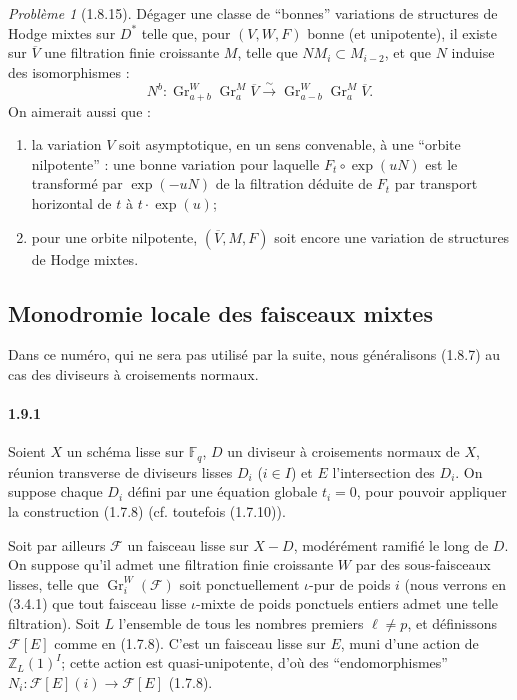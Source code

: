 \documentclass[12pt,a4paper]{article}
\theoremstyle{plain}
\theoremstyle{definition}
\theoremstyle{remark}
\newtheorem{probleme}{Probl\`eme}
\DeclareMathOperator{\Gr}{Gr}
\newcommand{\FF}{{\mathbb{F}}}
\newcommand{\ZZ}{{\mathbb{Z}}}
\begin{document}
\begin{probleme}[1.8.15]
D\'egager une classe de ``bonnes'' variations de structures de Hodge mixtes sur $D^*$ telle que, pour $(V, W, F)$ bonne (et unipotente), il existe sur $\overline{V}$ une filtration finie croissante $M$, telle que $NM_i \subset M_{i-2}$, et que $N$ induise des isomorphismes :
\[ N^b : \Gr_{a+b}^W \Gr_a^M \overline{V} \xrightarrow{\sim} \Gr_{a-b}^W \Gr_a^M \overline{V}. \]
On aimerait aussi que :
\begin{enumerate}[label=\alph*)]
\item la variation $V$ soit asymptotique, en un sens convenable, \`a une ``orbite nilpotente'' : une bonne variation pour laquelle $F_t \circ \exp(uN)$ est le transform\'e par $\exp(-uN)$ de la filtration d\'eduite de $F_t$ par transport horizontal de $t$ \`a $t \cdot \exp(u)$;
\item pour une orbite nilpotente, $(\overline{V}, M, F)$ soit encore une variation de structures de Hodge mixtes.
\end{enumerate}
\end{probleme}


\subsection{Monodromie locale des faisceaux mixtes}

Dans ce num\'ero, qui ne sera pas utilis\'e par la suite, nous g\'en\'eralisons (1.8.7) au cas des diviseurs \`a croisements normaux.

\paragraph{1.9.1}
Soient $X$ un sch\'ema lisse sur $\FF_q$, $D$ un diviseur \`a croisements normaux de $X$, r\'eunion transverse de diviseurs lisses $D_i$ ($i \in I$) et $E$ l'intersection des $D_i$. On suppose chaque $D_i$ d\'efini par une \'equation globale $t_i = 0$, pour pouvoir appliquer la construction (1.7.8) (cf. toutefois (1.7.10)).

Soit par ailleurs $\mathscr{F}$ un faisceau lisse sur $X - D$, mod\'er\'ement ramifi\'e le long de $D$. On suppose qu'il admet une filtration finie croissante $W$ par des sous-faisceaux lisses, telle que $\Gr_i^W(\mathscr{F})$ soit ponctuellement $\iota$-pur de poids $i$ (nous verrons en (3.4.1) que tout faisceau lisse $\iota$-mixte de poids ponctuels entiers admet une telle filtration). Soit $L$ l'ensemble de tous les nombres premiers $\ell \neq p$, et d\'efinissons $\mathscr{F}[E]$ comme en (1.7.8). C'est un faisceau lisse sur $E$, muni d'une action de $\ZZ_L(1)^I$; cette action est quasi-unipotente, d'o\`u des ``endomorphismes'' $N_i : \mathscr{F}[E](i) \to \mathscr{F}[E]$ (1.7.8).
\end{document}
